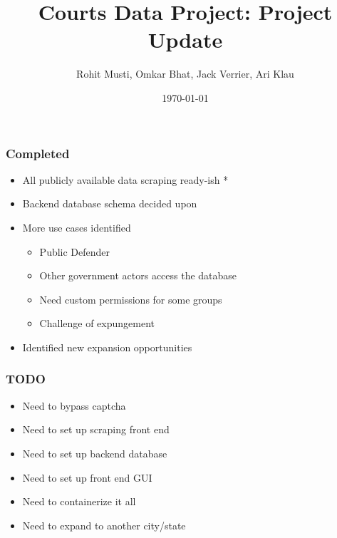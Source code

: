 \documentclass{beamer}
\title{Courts Data Project: Project Update}
\author{Rohit Musti, Omkar Bhat, Jack Verrier, Ari Klau}
\institute{Innovating in the Public Interest}
\date{\today}
\begin{document}
 
\frame{\titlepage}

\begin{frame}
\frametitle{Completed}
\begin{itemize}
    \item All publicly available data scraping ready-ish *
    \item Backend database schema decided upon
    \item More use cases identified
    \begin{itemize}
        \item Public Defender
        \item Other government actors access the database
        \item Need custom permissions for some groups
        \item Challenge of expungement
    \end{itemize}
    \item Identified new expansion opportunities
\end{itemize}
\end{frame}

\begin{frame}
\frametitle{TODO}
\begin{itemize}
    \item Need to bypass captcha
    \item Need to set up scraping front end
    \item Need to set up backend database
    \item Need to set up front end GUI
    \item Need to containerize it all 
    \item Need to expand to another city/state
\end{itemize}
\end{frame}
\end{document}
